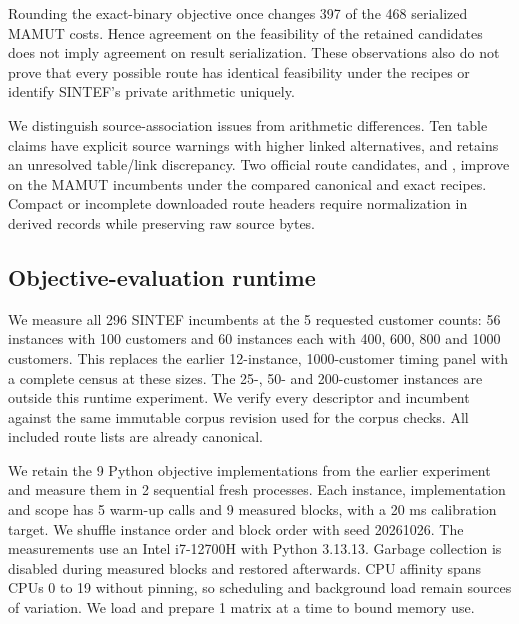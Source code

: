 Rounding the exact-binary objective once changes 397 of the 468 serialized MAMUT costs. Hence agreement on the feasibility of the retained candidates does not imply agreement on result serialization. These observations also do not prove that every possible route has identical feasibility under the recipes or identify SINTEF's private arithmetic uniquely.

We distinguish source-association issues from arithmetic differences. Ten table claims have explicit source warnings with higher linked alternatives, and  retains an unresolved table/link discrepancy. Two official route candidates,  and , improve on the MAMUT incumbents under the compared canonical and exact recipes. Compact or incomplete downloaded route headers require normalization in derived records while preserving raw source bytes.

\subsection{Objective-evaluation runtime}
We measure all 296 SINTEF incumbents at the 5 requested customer counts: 56 instances with 100 customers and 60 instances each with 400, 600, 800 and 1000 customers. This replaces the earlier 12-instance, 1000-customer timing panel with a complete census at these sizes. The 25-, 50- and 200-customer instances are outside this runtime experiment. We verify every descriptor and incumbent against the same immutable corpus revision used for the corpus checks. All included route lists are already canonical.

We retain the 9 Python objective implementations from the earlier experiment and measure them in 2 sequential fresh processes. Each instance, implementation and scope has 5 warm-up calls and 9 measured blocks, with a 20 ms calibration target. We shuffle instance order and block order with seed 20261026. The measurements use an Intel i7-12700H with Python 3.13.13. Garbage collection is disabled during measured blocks and restored afterwards. CPU affinity spans CPUs 0 to 19 without pinning, so scheduling and background load remain sources of variation. We load and prepare 1 matrix at a time to bound memory use.

